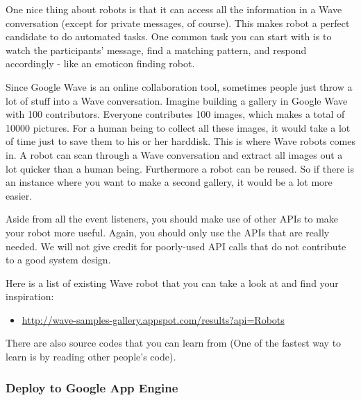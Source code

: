 
One nice thing about robots is that it can access all the information
in a Wave conversation (except for private messages, of course). This
makes robot a perfect candidate to do automated tasks. One common
task you can start with is to watch the participants' message, find
a matching pattern, and respond accordingly - like an emoticon finding robot.

Since Google Wave is an online collaboration tool, sometimes people
just throw a lot of stuff into a Wave conversation. Imagine building a gallery in Google Wave with 100
contributors. Everyone contributes 100 images, which makes a total of
10000 pictures. For a human being to collect all these images, it would
take a lot of time just to save them to his or her harddisk. This is where
Wave robots comes in. A robot can scan through a Wave conversation and
extract all images out a lot quicker than a human being. Furthermore a
robot can be reused.  So if there is an instance where you want to make a
second gallery, it would be a lot more easier.


Aside from all the event listeners, you should make use of other APIs
to make your robot more useful. Again, you should only use the APIs
that are really needed.  We will not give credit for poorly-used API
calls that do not contribute to a good system design.

Here is a list of existing Wave robot that you can take a look at and
find your inspiration:
\begin{itemize}
\item \url{http://wave-samples-gallery.appspot.com/results?api=Robots}
\end{itemize}
There are also source codes that you can learn from (One of the
fastest way to learn is by reading other people's code).


\subsubsection{Deploy to Google App Engine}

